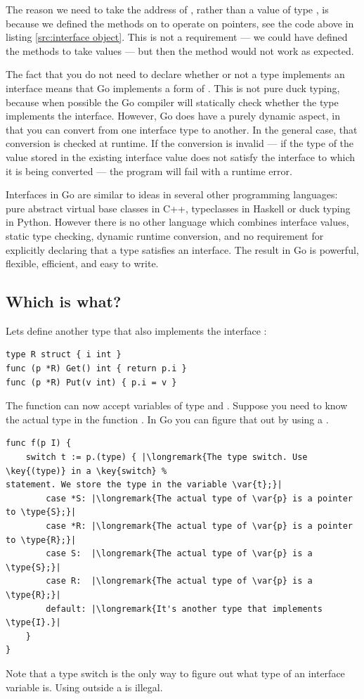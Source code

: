 The reason we need to take the address of , rather than a value of type
, is because we defined the methods on  to operate on
pointers, see the code above in listing \ref{src:interface object}.
This is not a requirement --- we could have defined the methods to take
values --- but then the  method would not work as expected.

The fact that you do not need to declare whether or not a type implements an
interface means that Go implements a form of 
\cite{duck_typing}. 
This is not
pure duck typing, because when possible the Go compiler will statically
check whether the type implements the interface. However, Go does have a
purely dynamic aspect, in that you can convert from one interface type
to another. In the general case, that conversion is checked at runtime.
If the conversion is invalid --- if the type of the value stored in the
existing interface value does not satisfy the interface to which it is
being converted --- the program will fail with a runtime error.

Interfaces in Go are similar to ideas in several other programming languages:
pure abstract virtual base classes in C++, typeclasses in Haskell or duck typing
in Python. However there is no other language which combines
interface values, static type checking, dynamic runtime conversion, and no
requirement for explicitly declaring that a type satisfies an interface. The
result in Go is powerful, flexible, efficient, and easy to write.

\subsection{Which is what?}
Lets define another type that also implements the interface :
\begin{lstlisting}[caption=Another type that implements I]
type R struct { i int }
func (p *R) Get() int { return p.i }
func (p *R) Put(v int) { p.i = v }
\end{lstlisting}
The function  can now accept variables of type  and .
Suppose you need to know the actual type in the function . In Go you can 
figure that out by using a .

\begin{lstlisting}
func f(p I) {
    switch t := p.(type) { |\longremark{The type switch. Use \key{(type)} in a \key{switch} %
statement. We store the type in the variable \var{t};}|
        case *S: |\longremark{The actual type of \var{p} is a pointer to \type{S};}|
        case *R: |\longremark{The actual type of \var{p} is a pointer to \type{R};}|
        case S:  |\longremark{The actual type of \var{p} is a \type{S};}|
        case R:  |\longremark{The actual type of \var{p} is a \type{R};}|
        default: |\longremark{It's another type that implements \type{I}.}|
    }
}
\end{lstlisting}
\showremarks
Note that a type switch is the only way to figure out what type of an interface variable is. Using
 outside a  is illegal.

